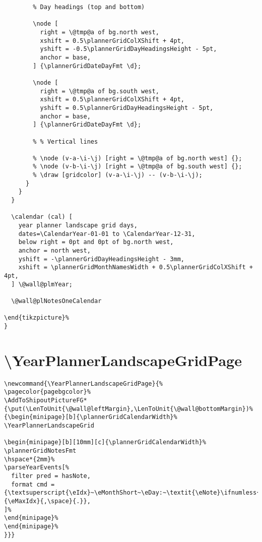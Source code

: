 \documentclass[11pt,oneside]{memoir-article}
\begin{document}
\begin{verbatim}
        % Day headings (top and bottom)

        \node [
          right = \@tmp@a of bg.north west,
          xshift = 0.5\plannerGridColXShift + 4pt,
          yshift = -0.5\plannerGridDayHeadingsHeight - 5pt,
          anchor = base,
        ] {\plannerGridDateDayFmt \d};

        \node [
          right = \@tmp@a of bg.south west,
          xshift = 0.5\plannerGridColXShift + 4pt,
          yshift = 0.5\plannerGridDayHeadingsHeight - 5pt,
          anchor = base,
        ] {\plannerGridDateDayFmt \d};

        % % Vertical lines

        % \node (v-a-\i-\j) [right = \@tmp@a of bg.north west] {};
        % \node (v-b-\i-\j) [right = \@tmp@a of bg.south west] {};
        % \draw [gridcolor] (v-a-\i-\j) -- (v-b-\i-\j);
      }
    }
  }

  \calendar (cal) [
    year planner landscape grid days,
    dates=\CalendarYear-01-01 to \CalendarYear-12-31,
    below right = 0pt and 0pt of bg.north west,
    anchor = north west,
    yshift = -\plannerGridDayHeadingsHeight - 3mm,
    xshift = \plannerGridMonthNamesWidth + 0.5\plannerGridColXShift + 4pt,
  ] \@wall@plmYear;

  \@wall@plNotesOneCalendar

\end{tikzpicture}%
}
\end{verbatim}

\section{\textbackslash YearPlannerLandscapeGridPage}
\label{sec:org772519b}

\begin{verbatim}
\newcommand{\YearPlannerLandscapeGridPage}{%
\pagecolor{pagebgcolor}%
\AddToShipoutPictureFG*{\put(\LenToUnit{\@wall@leftMargin},\LenToUnit{\@wall@bottomMargin})%
{\begin{minipage}[b]{\plannerGridCalendarWidth}%
\YearPlannerLandscapeGrid

\begin{minipage}[b][10mm][c]{\plannerGridCalendarWidth}%
\plannerGridNotesFmt
\hspace*{2mm}%
\parseYearEvents[%
  filter pred = hasNote,
  format cmd = {\textsuperscript{\eIdx}~\eMonthShort~\eDay:~\textit{\eNote}\ifnumless{\eIdx}{\eMaxIdx}{,\space}{.}},
]%
\end{minipage}%
\end{minipage}%
}}}
\end{verbatim}
\end{document}
